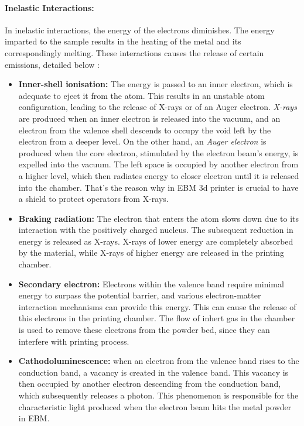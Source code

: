 \paragraph{Inelastic Interactions:} In inelastic interactions, the energy of the electrons diminishes. The energy imparted to the sample results in the heating of the metal and its correspondingly melting. These interactions causes the release of certain emissions, detailed below \cite{krumeich_properties_2015, goldstein_scanning_2018}:
\begin{itemize}
    \item \textbf{Inner-shell ionisation:} The energy is passed to an inner electron, which is adequate to eject it from the atom. This results in an unstable atom configuration, leading to the release of X-rays or of an Auger electron. \emph{X-rays} are produced when an inner electron is released into the vacuum, and an electron from the valence shell descends to occupy the void left by the electron from a deeper level. On the other hand, an \emph{Auger electron} is produced when the core electron, stimulated by the electron beam's energy, is expelled into the vacuum. The left space is occupied by another electron from a higher level, which then radiates energy to closer electron until it is released into the chamber. That's the reason why in EBM 3d printer is crucial to have a shield to protect operators from X-rays.
    \item \textbf{Braking radiation:} The electron that enters the atom slows down due to its interaction with the positively charged nucleus. The subsequent reduction in energy is released as X-rays. X-rays of lower energy are completely absorbed by the material, while X-rays of higher energy are released in the printing chamber.
    \item \textbf{Secondary electron:} Electrons within the valence band require minimal energy to surpass the potential barrier, and various electron-matter interaction mechanisms can provide this energy. This can cause the release of this electrons in the printing chamber. The flow of inhert gas in the chamber is used to remove these electrons from the powder bed, since they can interfere with printing process.
    \item \textbf{Cathodoluminescence:} when an electron from the valence band rises to the conduction band, a vacancy is created in the valence band. This vacancy is then occupied by another electron descending from the conduction band, which subsequently releases a photon. This phenomenon is responsible for the characteristic light produced when the electron beam hits the metal powder in EBM. 

\end{itemize}
